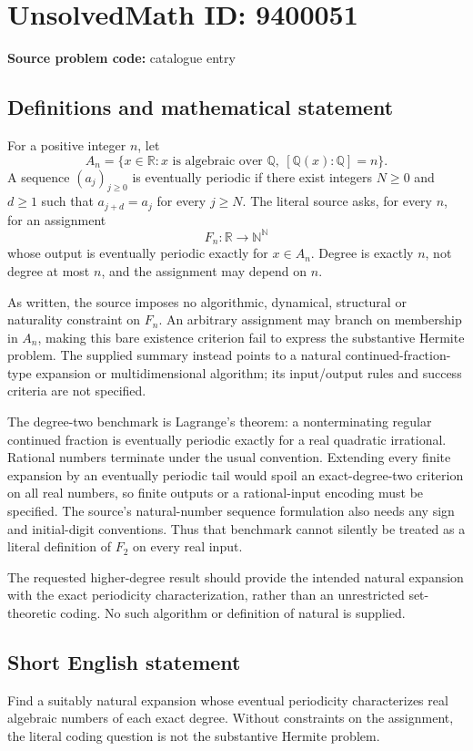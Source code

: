 \documentclass[11pt]{article}
\newcommand{\N}{\mathbb{N}}
\newcommand{\Q}{\mathbb{Q}}
\newcommand{\R}{\mathbb{R}}
\begin{document}
\section*{UnsolvedMath ID: 9400051}
\textbf{Source problem code:} catalogue entry
\subsection{Definitions and mathematical statement}
For a positive integer $n$, let
\[
A_n=\{x\in\R:x\text{ is algebraic over }\Q,\ [\Q(x):\Q]=n\}.
\]
A sequence $(a_j)_{j\geq0}$ is eventually periodic if there exist integers $N\geq0$ and $d\geq1$ such that $a_{j+d}=a_j$ for every $j\geq N$. The literal source asks, for every $n$, for an assignment
\[
F_n:\R\longrightarrow\N^{\N}
\]
whose output is eventually periodic exactly for $x\in A_n$. Degree is exactly $n$, not degree at most $n$, and the assignment may depend on $n$.

As written, the source imposes no algorithmic, dynamical, structural or naturality constraint on $F_n$. An arbitrary assignment may branch on membership in $A_n$, making this bare existence criterion fail to express the substantive Hermite problem. The supplied summary instead points to a natural continued-fraction-type expansion or multidimensional algorithm; its input/output rules and success criteria are not specified.

The degree-two benchmark is Lagrange's theorem: a nonterminating regular continued fraction is eventually periodic exactly for a real quadratic irrational. Rational numbers terminate under the usual convention. Extending every finite expansion by an eventually periodic tail would spoil an exact-degree-two criterion on all real numbers, so finite outputs or a rational-input encoding must be specified. The source's natural-number sequence formulation also needs any sign and initial-digit conventions. Thus that benchmark cannot silently be treated as a literal definition of $F_2$ on every real input.

The requested higher-degree result should provide the intended natural expansion with the exact periodicity characterization, rather than an unrestricted set-theoretic coding. No such algorithm or definition of natural is supplied.
\subsection{Short English statement}
Find a suitably natural expansion whose eventual periodicity characterizes real algebraic numbers of each exact degree. Without constraints on the assignment, the literal coding question is not the substantive Hermite problem.
\end{document}
